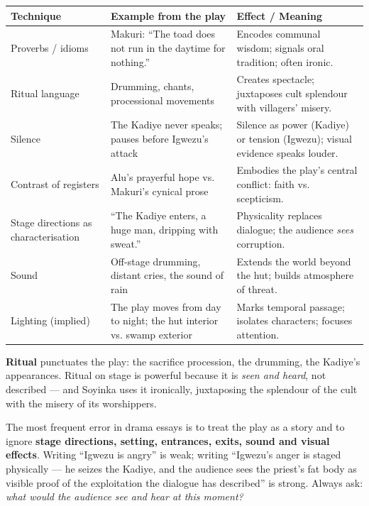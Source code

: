 \documentclass[11pt]{article}
\begin{document}
\begin{center}
\begin{tabularx}{\linewidth}{|l|X|X|}
\hline
\rowcolor{popblueL} \textbf{Technique} & \textbf{Example from the play} & \textbf{Effect / Meaning} \\
\hline
Proverbs / idioms & Makuri: ``The toad does not run in the daytime for nothing.'' & Encodes communal wisdom; signals oral tradition; often ironic. \\
\hline
Ritual language & Drumming, chants, processional movements & Creates spectacle; juxtaposes cult splendour with villagers' misery. \\
\hline
Silence & The Kadiye never speaks; pauses before Igwezu's attack & Silence as power (Kadiye) or tension (Igwezu); visual evidence speaks louder. \\
\hline
Contrast of registers & Alu's prayerful hope vs. Makuri's cynical prose & Embodies the play's central conflict: faith vs. scepticism. \\
\hline
Stage directions as characterisation & ``The Kadiye enters, a huge man, dripping with sweat.'' & Physicality replaces dialogue; the audience \emph{sees} corruption. \\
\hline
Sound & Off-stage drumming, distant cries, the sound of rain & Extends the world beyond the hut; builds atmosphere of threat. \\
\hline
Lighting (implied) & The play moves from day to night; the hut interior vs. swamp exterior & Marks temporal passage; isolates characters; focuses attention. \\
\hline
\end{tabularx}
\end{center}

\textbf{Ritual} punctuates the play: the sacrifice procession, the drumming, the Kadiye's appearances. Ritual on stage is powerful because it is \emph{seen and heard}, not described — and Soyinka uses it ironically, juxtaposing the splendour of the cult with the misery of its worshippers.

\begin{attention}
The most frequent error in drama essays is to treat the play as a story and to ignore \textbf{stage directions, setting, entrances, exits, sound and visual effects}. Writing ``Igwezu is angry'' is weak; writing ``Igwezu's anger is staged physically — he seizes the Kadiye, and the audience sees the priest's fat body as visible proof of the exploitation the dialogue has described'' is strong. Always ask: \emph{what would the audience see and hear at this moment?}
\end{attention}
\end{document}

